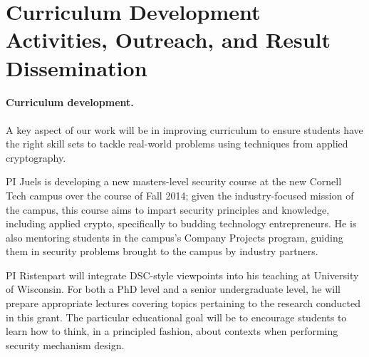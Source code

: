 \section{Curriculum Development Activities, Outreach, and Result Dissemination}
\label{sec:outreach}


\paragraph{Curriculum development.}  
A key aspect of our work will be in improving curriculum to ensure students
have the right skill sets to tackle real-world problems using techniques from applied cryptography. 

PI Juels is developing a new masters-level security course at the new Cornell
Tech campus over the course of Fall 2014; given the industry-focused mission of
the campus, this course aims to impart security principles and knowledge,
including applied crypto, specifically to budding technology entrepreneurs. He
is also mentoring students in the campus's Company Projects program, guiding
them in security problems brought to the campus by
industry partners.

PI Ristenpart will integrate DSC-style viewpoints into his teaching at
University of Wisconsin. For both a PhD level and a senior undergraduate
level, he will prepare appropriate lectures covering topics pertaining to the
research conducted in this grant. The particular educational goal will be to
encourage students to learn how to think, in a principled fashion, about
contexts when performing security mechanism design. 

